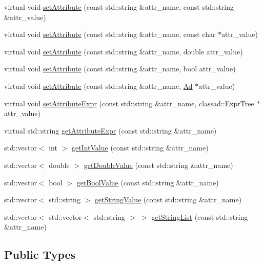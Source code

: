 \begin{CompactItemize}
\item 
virtual void \hyperlink{classglite_1_1wms_1_1jdl_1_1Ad_z19_10}{set\-Attribute} (const std::string \&attr\_\-name, const std::string \&attr\_\-value)
\item 
virtual void \hyperlink{classglite_1_1wms_1_1jdl_1_1Ad_z19_11}{set\-Attribute} (const std::string \&attr\_\-name, const char $\ast$attr\_\-value)
\item 
virtual void \hyperlink{classglite_1_1wms_1_1jdl_1_1Ad_z19_12}{set\-Attribute} (const std::string \&attr\_\-name, double attr\_\-value)
\item 
virtual void \hyperlink{classglite_1_1wms_1_1jdl_1_1Ad_z19_13}{set\-Attribute} (const std::string \&attr\_\-name, bool attr\_\-value)
\item 
virtual void \hyperlink{classglite_1_1wms_1_1jdl_1_1Ad_z19_14}{set\-Attribute} (const std::string \&attr\_\-name, \hyperlink{classglite_1_1wms_1_1jdl_1_1Ad}{Ad} $\ast$attr\_\-value)
\item 
virtual void \hyperlink{classglite_1_1wms_1_1jdl_1_1Ad_z19_15}{set\-Attribute\-Expr} (const std::string \&attr\_\-name, classad::Expr\-Tree $\ast$attr\_\-value)
\item 
virtual std::string \hyperlink{classglite_1_1wms_1_1jdl_1_1Ad_z19_16}{get\-Attribute\-Expr} (const std::string \&attr\_\-name)
\item 
std::vector$<$ int $>$ \hyperlink{classglite_1_1wms_1_1jdl_1_1Ad_z19_17}{get\-Int\-Value} (const std::string \&attr\_\-name)
\item 
std::vector$<$ double $>$ \hyperlink{classglite_1_1wms_1_1jdl_1_1Ad_z19_18}{get\-Double\-Value} (const std::string \&attr\_\-name)
\item 
std::vector$<$ bool $>$ \hyperlink{classglite_1_1wms_1_1jdl_1_1Ad_z19_19}{get\-Bool\-Value} (const std::string \&attr\_\-name)
\item 
std::vector$<$ std::string $>$ \hyperlink{classglite_1_1wms_1_1jdl_1_1Ad_z19_20}{get\-String\-Value} (const std::string \&attr\_\-name)
\item 
std::vector$<$ std::vector$<$ std::string $>$ $>$ \hyperlink{classglite_1_1wms_1_1jdl_1_1Ad_z19_21}{get\-String\-List} (const std::string \&attr\_\-name)
\end{CompactItemize}
\subsection*{Public Types}
